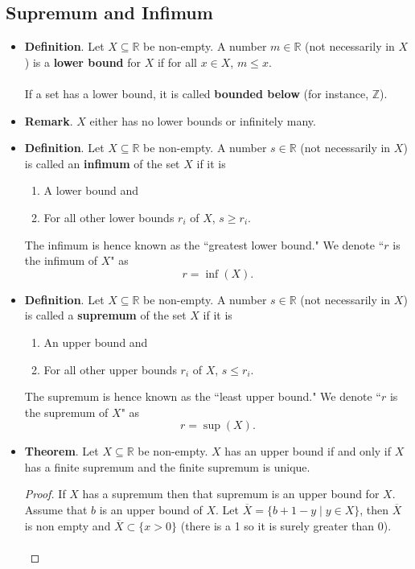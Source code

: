 \documentclass{article}
\newcommand{\Z}{\mathbb{Z}}
\newcommand{\R}{\mathbb{R}}
\newcommand{\set}[2]{\{ #1 \mid #2 \}}
\newcommand{\?}{\stackrel{?}{=}}
\begin{document}
\subsection*{Supremum and Infimum}

\begin{itemize}
    \item \textbf{Definition}. Let $X \subseteq \R$ be non-empty. A number $m \in \R$ (not necessarily in $X$) is a \textbf{lower bound} for $X$ if for all $x \in X$, $m \leq x$. \\\\
    If a set has a lower bound, it is called \textbf{bounded below} (for instance, $\Z$).
    \item \textbf{Remark}. $X$ either has no lower bounds or infinitely many.
    \item \textbf{Definition}. Let $X \subseteq \R$ be non-empty. A number $s \in \R$ (not necessarily in $X$) is called an \textbf{infimum} of the set $X$ if it is
    \begin{enumerate}[label=(\arabic*)]
        \item A lower bound and
        \item For all other lower bounds $r_i$ of $X$, $s \geq r_i$.
    \end{enumerate}
    The infimum is hence known as the ``greatest lower bound." We denote ``$r$ is the infimum of $X$" as
    $$r = \inf(X).$$
    \item \textbf{Definition}. Let $X \subseteq \R$ be non-empty. A number $s \in \R$ (not necessarily in $X$) is called a \textbf{supremum} of the set $X$ if it is
    \begin{enumerate}[label=(\arabic*)]
        \item An upper bound and
        \item For all other upper bounds $r_i$ of $X$, $s \leq r_i$.
    \end{enumerate}
    The supremum is hence known as the ``least upper bound." We denote ``$r$ is the supremum of $X$" as
    $$r = \sup(X).$$
    \item \textbf{Theorem}. Let $X \subseteq \R$ be non-empty. $X$ has an upper bound if and only if $X$ has a finite supremum and the finite supremum is unique.
    \begin{proof}
        If $X$ has a supremum then that supremum is an upper bound for $X$. Assume that $b$ is an upper bound of $X$. Let $\overline{X} = \set{b + 1 - y}{y \in X}$, then $\overline{X}$ is non empty and $\overline{X} \subset \{x > 0\}$ (there is a 1 so it is surely greater than 0). \\\\

\end{proof}
\end{itemize}
\end{document}
